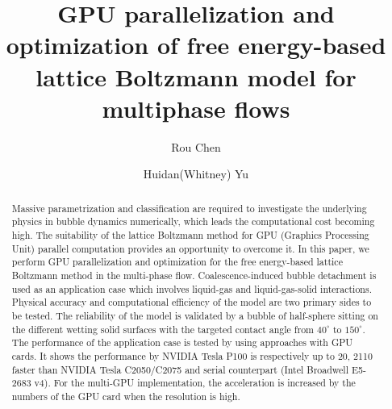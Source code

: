 \documentclass[10pt]{elsarticle}
\begin{document}
\begin{frontmatter}



\title{GPU parallelization and optimization of free energy-based lattice Boltzmann model for multiphase flows}


\author[1]{Rou Chen}%
\author[1]{Huidan(Whitney) Yu}

\address[1]{Department of Mechanical \& Energy Engineering, Indiana University-Purdue University Indianapolis, Indianapolis (IUPUI), IN 46202, USA}


\begin{abstract}
Massive parametrization and classification are required to investigate the underlying physics in bubble dynamics numerically, which leads the computational cost becoming high. The suitability of the lattice Boltzmann method for GPU (Graphics Processing Unit) parallel computation provides an opportunity to overcome it. In this paper, we perform GPU parallelization and optimization for the free energy-based lattice Boltzmann method in the multi-phase flow. Coalescence-induced bubble detachment is used as an application case which involves liquid-gas and liquid-gas-solid interactions. Physical accuracy and computational efficiency of the model are two primary sides to be tested. The reliability of the model is validated by a bubble of half-sphere sitting on the different wetting solid surfaces with the targeted contact angle from $40^\circ$ to $150^\circ$. The performance of the application case is tested by using approaches with GPU cards. It shows the performance by NVIDIA Tesla P100 is respectively up to 20, 2110 faster than NVIDIA Tesla C2050/C2075 and serial counterpart (Intel Broadwell E5-2683 v4).  For the multi-GPU implementation, the acceleration is increased by the numbers of the GPU card when the resolution is high.
\end{abstract}


\end{frontmatter}
\end{document}
